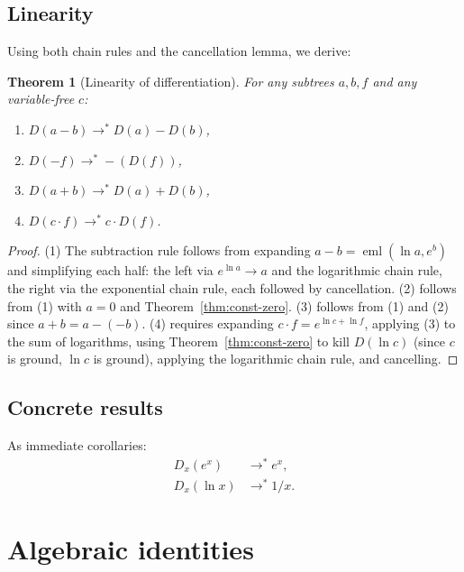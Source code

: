 \documentclass[11pt]{article}
\newtheorem{theorem}{Theorem}
\begin{document}
\subsection{Linearity}

Using both chain rules and the cancellation lemma, we derive:

\begin{theorem}[Linearity of differentiation]\label{thm:linear}
For any subtrees $a, b, f$ and any variable-free $c$:
\begin{enumerate}
\item $D(a - b) \to^{*} D(a) - D(b)$,
\item $D(-f) \to^{*} -(D(f))$,
\item $D(a + b) \to^{*} D(a) + D(b)$,
\item $D(c \cdot f) \to^{*} c \cdot D(f)$.
\end{enumerate}
\end{theorem}

\begin{proof}
(1) The subtraction rule follows from expanding $a - b =
\operatorname{eml}(\ln a, e^b)$ and simplifying each half: the left
via $e^{\ln a} \to a$ and the logarithmic chain rule, the right via
the exponential chain rule, each followed by cancellation.
(2) follows from (1) with $a = 0$ and Theorem~\ref{thm:const-zero}.
(3) follows from (1) and (2) since $a + b = a - (-b)$.
(4) requires expanding $c \cdot f = e^{\ln c + \ln f}$, applying (3)
to the sum of logarithms, using Theorem~\ref{thm:const-zero} to kill
$D(\ln c)$ (since $c$ is ground, $\ln c$ is ground), applying the
logarithmic chain rule, and cancelling.
\end{proof}

\subsection{Concrete results}

As immediate corollaries:
\begin{align}
  D_x(e^x) &\to^{*} e^x, \label{eq:dexp}\\
  D_x(\ln x) &\to^{*} 1/x. \label{eq:dln}
\end{align}

\section{Algebraic identities}
\label{sec:algebra}
\end{document}
